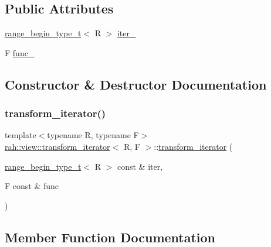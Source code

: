 \subsection*{Public Attributes}
\begin{DoxyCompactItemize}
\item 
\mbox{\hyperlink{namespacerah_afa7f59d1f37c7b9d9caed37551be9eaa}{range\+\_\+begin\+\_\+type\+\_\+t}}$<$ R $>$ \mbox{\hyperlink{structrah_1_1view_1_1transform__iterator_ac3c20401254ca24682913ba0e9c56284}{iter\+\_\+}}
\item 
F \mbox{\hyperlink{structrah_1_1view_1_1transform__iterator_a02ac2e8035d0b7917ee44967069def0d}{func\+\_\+}}
\end{DoxyCompactItemize}


\subsection{Constructor \& Destructor Documentation}
\mbox{\label{structrah_1_1view_1_1transform__iterator_ae8f127be961b14896c87d94e710a9a1a}} 
\subsubsection{\texorpdfstring{transform\_iterator()}{transform\_iterator()}}
{\footnotesize\ttfamily template$<$typename R, typename F$>$ \\
\mbox{\hyperlink{structrah_1_1view_1_1transform__iterator}{rah\+::view\+::transform\+\_\+iterator}}$<$ R, F $>$\+::\mbox{\hyperlink{structrah_1_1view_1_1transform__iterator}{transform\+\_\+iterator}} (\begin{DoxyParamCaption}\item[{\mbox{\hyperlink{namespacerah_afa7f59d1f37c7b9d9caed37551be9eaa}{range\+\_\+begin\+\_\+type\+\_\+t}}$<$ R $>$ const \&}]{iter,  }\item[{F const \&}]{func }\end{DoxyParamCaption})\hspace{0.3cm}{\ttfamily [inline]}}



\subsection{Member Function Documentation}
\mbox{\label{structrah_1_1view_1_1transform__iterator_a56c602664659b11bfca3da418c6977be}} 
